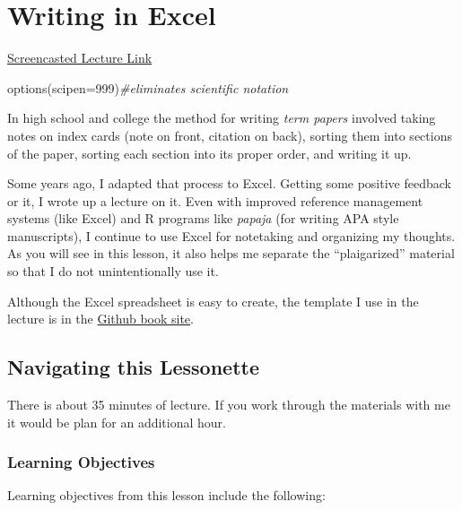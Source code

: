 \documentclass[
  english,
]{book}
\newenvironment{Shaded}{\begin{snugshade}}{\end{snugshade}}
\newcommand{\AttributeTok}[1]{\textcolor[rgb]{0.77,0.63,0.00}{#1}}
\newcommand{\CommentTok}[1]{\textcolor[rgb]{0.56,0.35,0.01}{\textit{#1}}}
\newcommand{\DecValTok}[1]{\textcolor[rgb]{0.00,0.00,0.81}{#1}}
\newcommand{\FunctionTok}[1]{\textcolor[rgb]{0.00,0.00,0.00}{#1}}
\newcommand{\NormalTok}[1]{#1}
\begin{document}
\hypertarget{Excel}{%
\chapter{Writing in Excel}\label{Excel}}

\href{HTTPS://SPU.HOSTED.PANOPTO.COM/PANOPTO/PAGES/VIEWER.ASPX?PID=DA5981E8-39FF-4E2D-A940-AAD3013C5A19}{Screencasted Lecture Link}

\begin{Shaded}
\begin{Highlighting}[]
\FunctionTok{options}\NormalTok{(}\AttributeTok{scipen=}\DecValTok{999}\NormalTok{)}\CommentTok{\#eliminates scientific notation}
\end{Highlighting}
\end{Shaded}

In high school and college the method for writing \emph{term papers} involved taking notes on index cards (note on front, citation on back), sorting them into sections of the paper, sorting each section into its proper order, and writing it up.

Some years ago, I adapted that process to Excel. Getting some positive feedback or it, I wrote up a lecture on it. Even with improved reference management systems (like Excel) and R programs like \emph{papaja} (for writing APA style manuscripts), I continue to use Excel for notetaking and organizing my thoughts. As you will see in this lesson, it also helps me separate the ``plaigarized'' material so that I do not unintentionally use it.

Although the Excel spreadsheet is easy to create, the template I use in the lecture is in the \href{https://github.com/lhbikos/ReC_Topics}{Github book site}.

\hypertarget{navigating-this-lessonette-2}{%
\section{Navigating this Lessonette}\label{navigating-this-lessonette-2}}

There is about 35 minutes of lecture. If you work through the materials with me it would be plan for an additional hour.

\hypertarget{learning-objectives-3}{%
\subsection{Learning Objectives}\label{learning-objectives-3}}

Learning objectives from this lesson include the following:
\end{document}
